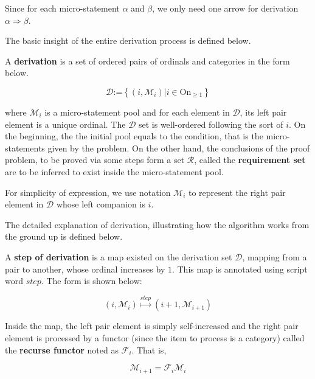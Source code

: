 \documentclass[preprint]{elsarticle}
\numberwithin{theorem}{section}	%
\numberwithin{axiom}{section}	%
\numberwithin{definition}{section}	%
\begin{document}
Since for each micro-statement \(\alpha\) and \(\beta\), we only need one arrow for derivation \(\alpha \Rightarrow \beta\).

The basic insight of the entire derivation process is defined below.

\begin{definition}
	A \textbf{ derivation} is a set of ordered pairs of ordinals and categories in the form below. 
	
	\begin{equation}
		\mathcal{D}\text{:=}\left\{\left(i,\mathcal{M}_i\right)|i\in \text{On}_{\geq 1}\right\}
	\end{equation}
	
	\noindent where \(\mathcal{M}_i\) { }is a micro-statement pool and for each element in \(\mathcal{D}\), its left pair element is a unique ordinal. The $\mathcal{D}$ set is well-ordered following the sort of \(i\). On the beginning, the the initial pool equals to the condition, that is the micro-statements given by the problem. On the other hand, the conclusions of the proof problem, to be proved via some steps form a set \(\mathcal{R}\), called the \textbf{requirement set} are to be inferred to exist inside the micro-statement pool.
	
	For simplicity of expression, we use notation \(\mathcal{M}_i\) to represent the right pair element in $\mathcal{D}$ { }whose left companion is \(i\).
\end{definition}

The detailed explanation of derivation, illustrating how the algorithm works from the ground up is defined below.

\begin{definition}
	A \textbf{ step of derivation} is a map existed on the derivation set \(\mathcal{D}\), mapping from a pair to another, whose ordinal increases by \(1\). This map is annotated using script word \(\mathit{s}\mathit{t}\mathit{e}\mathit{p}\). The form is shown below:
	
	\begin{equation}
		\left(i,\mathcal{M}_i\right)\overset{\mathit{s}\mathit{t}\mathit{e}\mathit{p}}{\mapsto }\left(i+1,\mathcal{M}_{i+1}\right)
	\end{equation}
	
	Inside the map, the left pair element is simply self-increased and the right pair element is processed by a functor (since the item to process is a category) called the \textbf{ recurse functor} noted as \(\mathcal{F}_i\). That is,
	
	\begin{equation}
		\mathcal{M}_{i+1}=\mathcal{F}_i\mathcal{M}_i
	\end{equation}
\end{definition}
\end{document}
